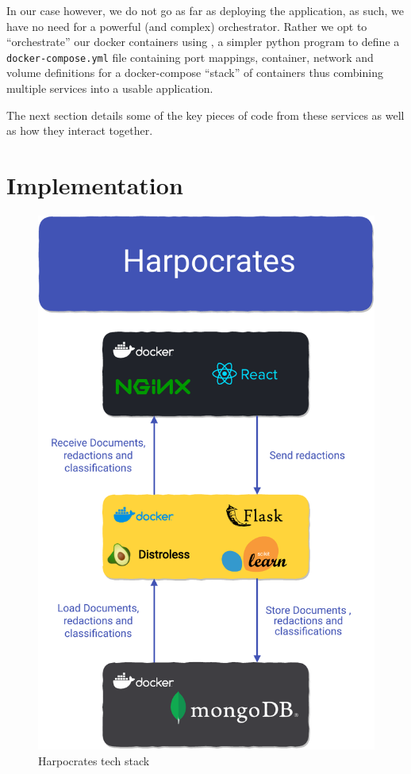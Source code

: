 \documentclass[\version]{l4proj}
\begin{document}
In our case however, we do not go as far as deploying the application, as such, we have no need for a powerful (and complex) orchestrator.
Rather we opt to ``orchestrate'' our docker containers using \textcite{DockerCompose2020}, a simpler python program to define a \verb|docker-compose.yml| file containing port mappings, container, network and volume definitions for a docker-compose ``stack'' of containers thus combining multiple services into a usable application.

The next section details some of the key pieces of code from these services as well as how they interact together.


\chapter{Implementation}

\begin{figure}
    \includegraphics[width=\linewidth]{figures/tech_stack_no_background.pdf}
    \caption{Harpocrates tech stack}\label{fig:tech_stack}
    \vspace{-50pt}
\end{figure}
\end{document}
